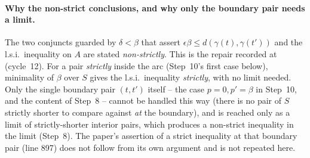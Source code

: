 \begin{lemma}
  \paragraph{Why the non-strict conclusions, and why only the boundary pair needs a limit.} The two
  conjuncts guarded by $\delta<\beta$ that assert $\epsilon\beta \le d(\gamma(t),\gamma(t'))$ and the
  l.s.i.\ inequality on $A$ are stated \emph{non-strictly}. This is the repair recorded at
   (cycle~12). For a pair \emph{strictly} inside the arc (Step~10's first case below),
  minimality of $\beta$ over $S$ gives the l.s.i.\ inequality \emph{strictly}, with no limit needed.
  Only the single boundary pair $(t,t')$ itself -- the case $p=0,p'=\beta$ in Step~10, and the
  content of Step~8 -- cannot be handled this way (there is no pair of $S$ strictly shorter to
  compare against \emph{at} the boundary), and is reached only as a limit of strictly-shorter
  interior pairs, which produces a non-strict inequality in the limit (Step~8). The paper's
  assertion of a strict inequality at that boundary pair (line 897) does not follow from its own
  argument and is not repeated here.
\end{lemma}
